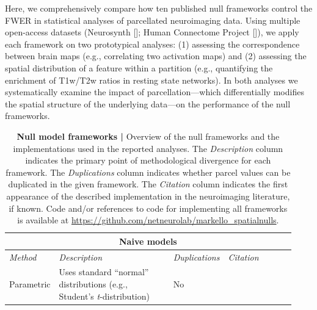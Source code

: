 \documentclass[12pt,aps,pra,reprint,showkeys]{revtex4-1}
\begin{document}
Here, we comprehensively compare how ten published null frameworks control the FWER in statistical analyses of parcellated neuroimaging data.
Using multiple open-access datasets (Neurosynth [\citealt{yarkoni2011natmethods}]; Human Connectome Project [\citealt{vanessen2013neuroimage}]), we apply each framework on two prototypical analyses: (1) assessing the correspondence between brain maps (e.g., correlating two activation maps) and (2) assessing the spatial distribution of a feature within a partition (e.g., quantifying the enrichment of T1w/T2w ratios in resting state networks).
In both analyses we systematically examine the impact of parcellation---which differentially modifies the spatial structure of the underlying data---on the performance of the null frameworks.

\begin{table}[htp]
    \caption{
      \textbf{Null model frameworks | }
      Overview of the null frameworks and the implementations used in the reported analyses.
      The \emph{Description} column indicates the primary point of methodological divergence for each framework.
      The \emph{Duplications} column indicates whether parcel values can be duplicated in the given framework.
      The \emph{Citation} column indicates the first appearance of the described implementation in the neuroimaging literature, if known.
      Code and/or references to code for implementing all frameworks is available at \url{https://github.com/netneurolab/markello_spatialnulls}.
      \vspace{-0.5\baselineskip}
    }
    \label{table-null-models}
    \setlength{\tabcolsep}{4.5pt}
    \renewcommand{\arraystretch}{1.25}
    \begin{center}
      \begin{tabular}{p{0.15\linewidth} p{0.43\linewidth} p{0.10\linewidth} p{0.25\linewidth}}
                                                                                                                                                                         \toprule
        \multicolumn{4}{c}{\textbf{Naive models}}                                                                                                                     \\ \toprule
        \emph{Method}   & \emph{Description}                                                                                & \emph{Duplications} & \emph{Citation}   \\ \midrule
        Parametric      & Uses standard ``normal'' distributions (e.g., Student's \emph{t}-distribution)                    & No  &                                   \\

\end{tabular}
\end{center}
\end{table}
\end{document}
